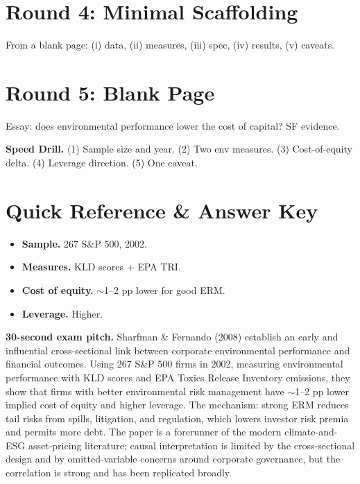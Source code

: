 \documentclass[11pt]{article}
\begin{document}
\section*{Round 4: Minimal Scaffolding}
From a blank page: (i) data, (ii) measures, (iii) spec, (iv) results, (v) caveats.

\section*{Round 5: Blank Page}
Essay: does environmental performance lower the cost of capital? SF evidence.

\vspace{6pt}
\begin{drillbox}
\textbf{Speed Drill.} (1) Sample size and year. (2) Two env measures. (3) Cost-of-equity delta. (4) Leverage direction. (5) One caveat.
\end{drillbox}

\section*{Quick Reference \& Answer Key}
\begin{answerbox}
\begin{itemize}
\item \textbf{Sample.} 267 S\&P 500, 2002.
\item \textbf{Measures.} KLD scores $+$ EPA TRI.
\item \textbf{Cost of equity.} $\sim$1--2 pp lower for good ERM.
\item \textbf{Leverage.} Higher.
\end{itemize}
\end{answerbox}

\begin{keybox}
\textbf{30-second exam pitch.} Sharfman \& Fernando (2008) establish an early and influential cross-sectional link between corporate environmental performance and financial outcomes. Using 267 S\&P 500 firms in 2002, measuring environmental performance with KLD scores and EPA Toxics Release Inventory emissions, they show that firms with better environmental risk management have $\sim$1--2 pp lower implied cost of equity and higher leverage. The mechanism: strong ERM reduces tail risks from spills, litigation, and regulation, which lowers investor risk premia and permits more debt. The paper is a forerunner of the modern climate-and-ESG asset-pricing literature; causal interpretation is limited by the cross-sectional design and by omitted-variable concerns around corporate governance, but the correlation is strong and has been replicated broadly.
\end{keybox}
\end{document}
